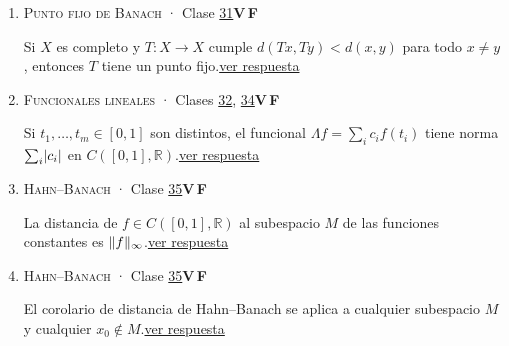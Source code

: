\documentclass[11pt,a4paper]{article}
\newcommand{\R}{\mathbb{R}}\newcommand{\N}{\mathbb{N}}\newcommand{\Q}{\mathbb{Q}}
\providecommand{\lt}{<}\providecommand{\gt}{>}
\begin{document}
\begin{enumerate}[leftmargin=2.2em,itemsep=8pt,label=\textbf{\arabic*.}]
\item[\hyperlink{r-18}{\textbf{18.}}] \hypertarget{q-18}{}{\small \textsc{Punto fijo de Banach} · Clase \href{https://decostruttivismo.github.io/MAT2514-repaso/pdf/MAT2514_apuntes_completos.pdf\#nameddest=section.31}{31}}\hfill \textbf{V}\,\fbox{\rule{0pt}{6pt}\hspace{6pt}}\quad\textbf{F}\,\fbox{\rule{0pt}{6pt}\hspace{6pt}}\par Si $X$ es completo y $T\colon X\to X$ cumple $d(Tx,Ty)\lt d(x,y)$ para todo $x\ne y$, entonces $T$ tiene un punto fijo.\hfill{\footnotesize\hyperlink{r-18}{ver respuesta}}
\item[\hyperlink{r-19}{\textbf{19.}}] \hypertarget{q-19}{}{\small \textsc{Funcionales lineales} · Clases \href{https://decostruttivismo.github.io/MAT2514-repaso/pdf/MAT2514_apuntes_completos.pdf\#nameddest=section.32}{32}, \href{https://decostruttivismo.github.io/MAT2514-repaso/pdf/MAT2514_apuntes_completos.pdf\#nameddest=section.34}{34}}\hfill \textbf{V}\,\fbox{\rule{0pt}{6pt}\hspace{6pt}}\quad\textbf{F}\,\fbox{\rule{0pt}{6pt}\hspace{6pt}}\par Si $t_1,\dots,t_m\in[0,1]$ son distintos, el funcional $\Lambda f=\sum_ic_if(t_i)$ tiene norma $\sum_i\lvert c_i\rvert$ en $C([0,1],\R)$.\hfill{\footnotesize\hyperlink{r-19}{ver respuesta}}
\item[\hyperlink{r-20}{\textbf{20.}}] \hypertarget{q-20}{}{\small \textsc{Hahn–Banach} · Clase \href{https://decostruttivismo.github.io/MAT2514-repaso/pdf/MAT2514_apuntes_completos.pdf\#nameddest=section.35}{35}}\hfill \textbf{V}\,\fbox{\rule{0pt}{6pt}\hspace{6pt}}\quad\textbf{F}\,\fbox{\rule{0pt}{6pt}\hspace{6pt}}\par La distancia de $f\in C([0,1],\R)$ al subespacio $M$ de las funciones constantes es $\lVert f\rVert_\infty$.\hfill{\footnotesize\hyperlink{r-20}{ver respuesta}}
\item[\hyperlink{r-21}{\textbf{21.}}] \hypertarget{q-21}{}{\small \textsc{Hahn–Banach} · Clase \href{https://decostruttivismo.github.io/MAT2514-repaso/pdf/MAT2514_apuntes_completos.pdf\#nameddest=section.35}{35}}\hfill \textbf{V}\,\fbox{\rule{0pt}{6pt}\hspace{6pt}}\quad\textbf{F}\,\fbox{\rule{0pt}{6pt}\hspace{6pt}}\par El corolario de distancia de Hahn–Banach se aplica a cualquier subespacio $M$ y cualquier $x_0\notin M$.\hfill{\footnotesize\hyperlink{r-21}{ver respuesta}}

\end{enumerate}
\end{document}
